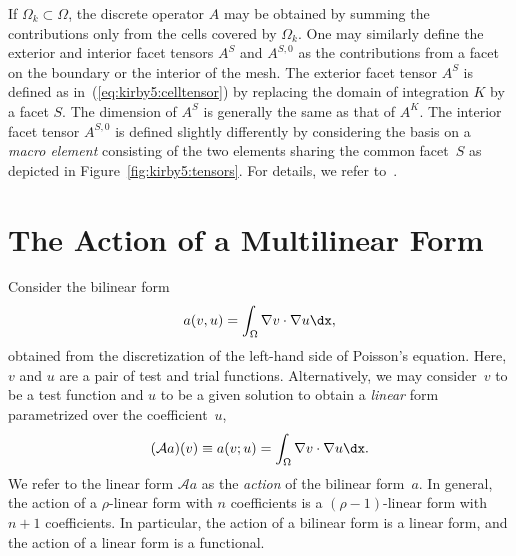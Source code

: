 If $\Omega_k \subset \Omega$, the discrete operator $A$ may be
obtained by summing the contributions only from the cells covered by
$\Omega_k$. One may similarly define the exterior and interior facet
tensors $A^S$ and $A^{S,0}$ as the contributions from a facet on the
boundary or the interior of the mesh. The exterior facet tensor $A^S$
is defined as in~(\ref{eq:kirby5:celltensor}) by replacing the domain
of integration $K$ by a facet $S$. The dimension of $A^S$ is generally
the same as that of $A^K$. The interior facet tensor $A^{S,0}$ is
defined slightly differently by considering the basis on a \emph{macro
  element} consisting of the two elements sharing the common facet~$S$
as depicted in Figure~\ref{fig:kirby5:tensors}. For details, we refer
to~\cite{OlgaardLoggEtAl2008}.

\section{The Action of a Multilinear Form}

Consider the bilinear form
\begin{displaymath}
  a(v, u) = \int_{\Omega} \nabla v \cdot \nabla u \dx,
\end{displaymath}
obtained from the discretization of the left-hand side of Poisson's
equation. Here, $v$ and $u$ are a pair of test and trial functions.
Alternatively, we may consider~$v$ to be a test function and $u$ to be
a given solution to obtain a \emph{linear} form parametrized over the
coefficient~$u$,
\begin{displaymath}
  (\mathcal{A} a) (v) \equiv a(v; u) = \int_{\Omega} \nabla v \cdot \nabla u \dx.
\end{displaymath}
We refer to the linear form $\mathcal{A}a$ as the \emph{action} of the
bilinear form~$a$. In general, the action of a $\rho$-linear form with
$n$ coefficients is a $(\rho-1)$-linear form with $n+1$ coefficients.
In particular, the action of a bilinear form is a linear form, and the
action of a linear form is a functional.

